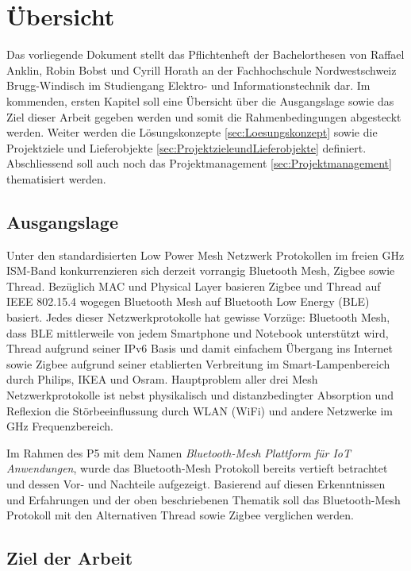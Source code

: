 	\clearpage
\section{Übersicht}\label{sec:Uebersicht}

Das vorliegende Dokument stellt das Pflichtenheft der Bachelorthesen von Raffael Anklin, Robin Bobst und Cyrill Horath an der Fachhochschule Nordwestschweiz Brugg-Windisch im Studiengang Elektro- und Informationstechnik dar. 
Im kommenden, ersten Kapitel soll eine Übersicht über die Ausgangslage sowie das Ziel dieser Arbeit gegeben werden und somit die Rahmenbedingungen abgesteckt werden. Weiter werden die Lösungskonzepte \ref{sec:Loesungskonzept} sowie die Projektziele und Lieferobjekte \ref{sec:ProjektzieleundLieferobjekte} definiert. Abschliessend soll auch noch das Projektmanagement \ref{sec:Projektmanagement} thematisiert werden. 

\subsection{Ausgangslage}\label{subsec:Ausgangslage}

Unter den standardisierten Low Power Mesh Netzwerk Protokollen im
freien GHz ISM-Band konkurrenzieren sich derzeit vorrangig Bluetooth Mesh, Zigbee sowie Thread.
Bezüglich MAC und Physical Layer basieren Zigbee und Thread auf IEEE 802.15.4 wogegen Bluetooth Mesh auf Bluetooth Low Energy (BLE)
basiert.
Jedes dieser Netzwerkprotokolle hat gewisse Vorzüge: Bluetooth Mesh, dass BLE mittlerweile von jedem Smartphone und Notebook unterstützt wird, Thread aufgrund seiner IPv6 Basis und damit einfachem Übergang ins Internet sowie Zigbee aufgrund seiner etablierten Verbreitung im Smart-Lampenbereich durch Philips, IKEA und Osram.
Hauptproblem aller drei Mesh Netzwerkprotokolle ist nebst physikalisch und distanzbedingter Absorption und Reflexion die Störbeeinflussung durch WLAN (WiFi) und andere Netzwerke im GHz Frequenzbereich.

Im Rahmen des P5 mit dem Namen \textit{Bluetooth-Mesh Plattform für IoT Anwendungen}, wurde das Bluetooth-Mesh Protokoll bereits vertieft betrachtet und dessen Vor- und Nachteile aufgezeigt. Basierend auf diesen Erkenntnissen und Erfahrungen und der oben beschriebenen Thematik soll das Bluetooth-Mesh Protokoll mit den Alternativen Thread sowie Zigbee verglichen werden.

\subsection{Ziel der Arbeit}\label{subsec:ZielderArbeit}

